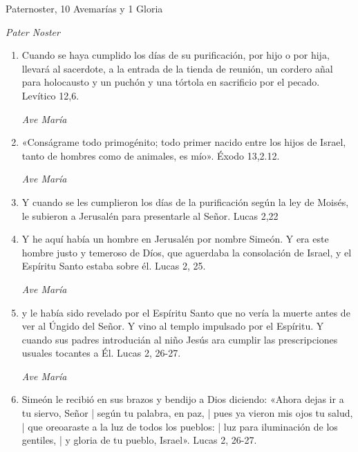\documentclass[a4paper,11pt, oneside]{report}
\begin{document}
         Paternoster, 10 Avemarías y 1 Gloria
        
                \textit{Pater Noster}

        \begin{enumerate}
        
          \item Cuando se haya cumplido los días de su purificación, por hijo o por hija, llevará al sacerdote, a la entrada de la tienda de reunión, un cordero añal para holocausto y un puchón y una tórtola en sacrificio por el pecado. Levítico 12,6.
          
          \textit{Ave María}
          
          \item «Conságrame todo primogénito; todo primer nacido entre los hijos de Israel, tanto de hombres como de animales, es mío». Éxodo 13,2.12.
          
          \textit{Ave María}
          
          \item Y cuando se les cumplieron los días de la purificación según la ley de Moisés, le subieron a Jerusalén para presentarle al Señor. Lucas 2,22
          
          \item Y he aquí había un hombre en Jerusalén por nombre Simeón. Y era este hombre justo y temeroso de Díos, que aguerdaba la consolación de Israel, y el Espíritu Santo estaba sobre él. Lucas 2, 25.
          
          \textit{Ave María}

          \item  y le había sido revelado por el Espíritu Santo que no vería la muerte antes de ver al Úngido del Señor. Y vino al templo impulsado por el Espíritu. Y cuando sus padres introducián al niño Jesús ara cumplir las prescripciones usuales tocantes a Él. Lucas 2, 26-27.
          
          \textit{Ave María}

          \item Simeón le recibió en sus brazos y bendijo a Dios diciendo: «Ahora dejas ir a tu siervo, Señor | según tu palabra, en paz, | pues ya vieron mis ojos tu salud, | que oreoaraste a la luz de todos los pueblos: | luz para iluminación de los gentiles, | y gloria de tu pueblo, Israel». Lucas 2, 26-27.
          

\end{enumerate}
\end{document}
